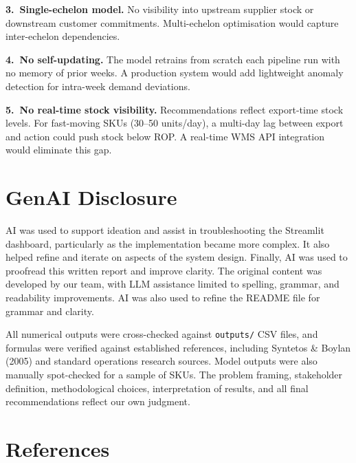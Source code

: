 \documentclass[11pt,letterpaper]{article}
\begin{document}
\textbf{3.~Single-echelon model.} No visibility into upstream supplier stock or downstream customer commitments. Multi-echelon optimisation would capture inter-echelon dependencies.

\textbf{4.~No self-updating.} The model retrains from scratch each pipeline run with no memory of prior weeks. A production system would add lightweight anomaly detection for intra-week demand deviations.

\textbf{5.~No real-time stock visibility.} Recommendations reflect export-time stock levels. For fast-moving SKUs (30--50 units/day), a multi-day lag between export and action could push stock below ROP. A real-time WMS API integration would eliminate this gap.


\section{GenAI Disclosure}
\label{sec:genai}

AI was used to support ideation and assist in troubleshooting the Streamlit dashboard, particularly as the implementation became more complex. It also helped refine and iterate on aspects of the system design. Finally, AI was used to proofread this written report and improve clarity. The original content was developed by our team, with LLM assistance limited to spelling, grammar, and readability improvements. AI was also used to refine the README file for grammar and clarity.

All numerical outputs were cross-checked against \texttt{outputs/} CSV files, and formulas were verified against established references, including Syntetos \& Boylan (2005) and standard operations research sources. Model outputs were also manually spot-checked for a sample of SKUs. The problem framing, stakeholder definition, methodological choices, interpretation of results, and all final recommendations reflect our own judgment.


\section{References}
\label{sec:references}
\end{document}
